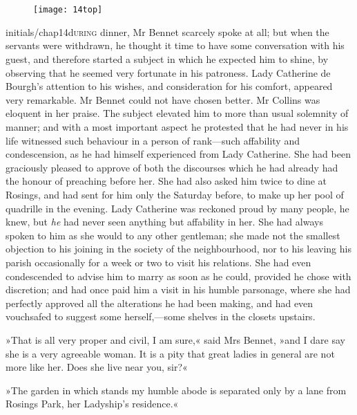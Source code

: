 \chapter[Chapter \thechapter]{}
\begin{figure}[t!]
\centering
\texttt{[image: 14top]}
\end{figure}

\lettrine[lines=5,image=true,lhang=.1]{initials/chap14d}{uring}  dinner, Mr Bennet scarcely spoke at all; but when the servants were withdrawn, he thought it time to have some conversation with his guest, and therefore started a subject in which he expected him to shine, by observing that he seemed very fortunate in his patroness. Lady Catherine de Bourgh's attention to his wishes, and consideration for his comfort, appeared very remarkable. Mr Bennet could not have chosen better. Mr Collins was eloquent in her praise. The subject elevated him to more than usual solemnity of manner; and with a most important aspect he protested that he had never in his life witnessed such behaviour in a person of rank—such affability and condescension, as he had himself experienced from Lady Catherine. She had been graciously pleased to approve of both the discourses which he had already had the honour of preaching before her. She had also asked him twice to dine at Rosings, and had sent for him only the Saturday before, to make up her pool of quadrille in the evening. Lady Catherine was reckoned proud by many people, he knew, but \textit{he} had never seen anything but affability in her. She had always spoken to him as she would to any other gentleman; she made not the smallest objection to his joining in the society of the neighbourhood, nor to his leaving his parish occasionally for a week or two to visit his relations. She had even condescended to advise him to marry as soon as he could, provided he chose with discretion; and had once paid him a visit in his humble parsonage, where she had perfectly approved all the alterations he had been making, and had even vouchsafed to suggest some herself,—some shelves in the closets upstairs.

»That is all very proper and civil, I am sure,« said Mrs Bennet, »and I dare say she is a very agreeable woman. It is a pity that great ladies in general are not more like her. Does she live near you, sir?«

»The garden in which stands my humble abode is separated only by a lane from Rosings Park, her Ladyship's residence.«

